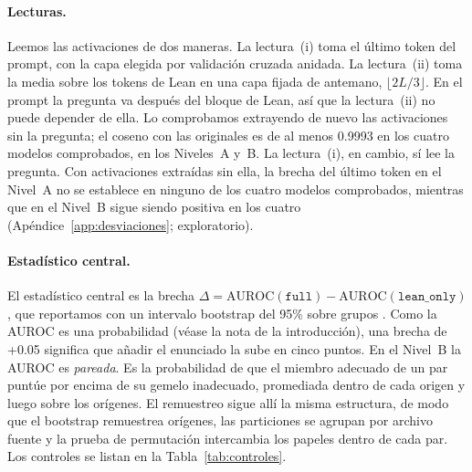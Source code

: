 \documentclass[10pt]{article}
\newcommand{\vr}[1]{\texttt{#1}}
\newcommand{\D}{\Delta}
\begin{document}
\paragraph{Lecturas.}
Leemos las activaciones de dos maneras. La lectura~(i) toma el último token del prompt, con la capa elegida por
validación cruzada anidada. La lectura~(ii) toma la media sobre los tokens de Lean en una capa fijada de antemano,
$\lfloor 2L/3 \rfloor$.
En el prompt la pregunta va después del bloque de Lean, así que la lectura~(ii) no puede depender de ella. Lo
comprobamos extrayendo de nuevo las activaciones sin la pregunta; el coseno con las originales es de al menos 0.9993 en los cuatro modelos comprobados, en los Niveles~A y~B.
La lectura~(i), en cambio, sí lee la pregunta. Con activaciones extraídas sin ella, la brecha del último token en el
Nivel~A no se establece en ninguno de los cuatro modelos comprobados, mientras que en el Nivel~B sigue siendo positiva
en los cuatro (Apéndice~\ref{app:desviaciones}; exploratorio).

\paragraph{Estadístico central.}
El estadístico central es la brecha
$\D = \mathrm{AUROC}(\vr{full}) - \mathrm{AUROC}(\vr{lean\_only})$, que reportamos con un intervalo bootstrap del 95\% sobre grupos \citep{efron}.
Como la AUROC es una probabilidad (véase la nota de la introducción), una brecha de +0.05 significa que añadir el
enunciado la sube en cinco puntos.
En el Nivel~B la AUROC es \emph{pareada}. Es la probabilidad de que el miembro adecuado de un par puntúe por encima
de su gemelo inadecuado, promediada dentro de cada origen y luego sobre los orígenes. El remuestreo sigue allí la
misma estructura, de modo que el bootstrap remuestrea orígenes, las particiones se agrupan por archivo fuente y la
prueba de permutación intercambia los papeles dentro de cada par.
Los controles se listan en la Tabla~\ref{tab:controles}.
\end{document}
